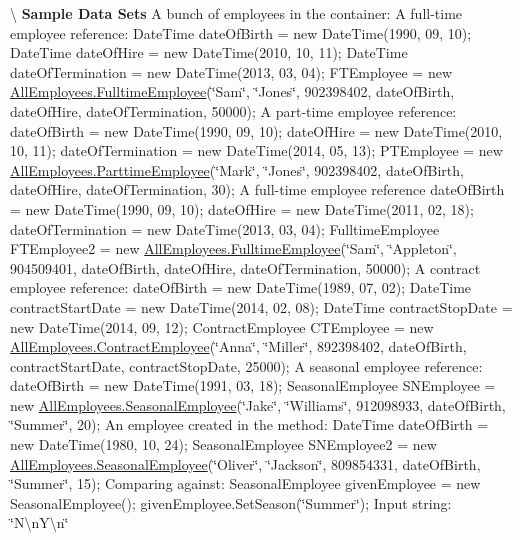 \textbackslash{} {\bfseries  Sample Data Sets} A bunch of employees in the container\+: A full-\/time employee reference\+: Date\+Time date\+Of\+Birth = new Date\+Time(1990, 09, 10); Date\+Time date\+Of\+Hire = new Date\+Time(2010, 10, 11); Date\+Time date\+Of\+Termination = new Date\+Time(2013, 03, 04); F\+T\+Employee = new \hyperlink{class_all_employees_1_1_fulltime_employee}{All\+Employees.\+Fulltime\+Employee}(\char`\"{}\+Sam\char`\"{}, \char`\"{}\+Jones\char`\"{}, 902398402, date\+Of\+Birth, date\+Of\+Hire, date\+Of\+Termination, 50000); A part-\/time employee reference\+: date\+Of\+Birth = new Date\+Time(1990, 09, 10); date\+Of\+Hire = new Date\+Time(2010, 10, 11); date\+Of\+Termination = new Date\+Time(2014, 05, 13); P\+T\+Employee = new \hyperlink{class_all_employees_1_1_parttime_employee}{All\+Employees.\+Parttime\+Employee}(\char`\"{}\+Mark\char`\"{}, \char`\"{}\+Jones\char`\"{}, 902398402, date\+Of\+Birth, date\+Of\+Hire, date\+Of\+Termination, 30); A full-\/time employee reference date\+Of\+Birth = new Date\+Time(1990, 09, 10); date\+Of\+Hire = new Date\+Time(2011, 02, 18); date\+Of\+Termination = new Date\+Time(2013, 03, 04); Fulltime\+Employee F\+T\+Employee2 = new \hyperlink{class_all_employees_1_1_fulltime_employee}{All\+Employees.\+Fulltime\+Employee}(\char`\"{}\+Sam\char`\"{}, \char`\"{}\+Appleton\char`\"{}, 904509401, date\+Of\+Birth, date\+Of\+Hire, date\+Of\+Termination, 50000); A contract employee reference\+: date\+Of\+Birth = new Date\+Time(1989, 07, 02); Date\+Time contract\+Start\+Date = new Date\+Time(2014, 02, 08); Date\+Time contract\+Stop\+Date = new Date\+Time(2014, 09, 12); Contract\+Employee C\+T\+Employee = new \hyperlink{class_all_employees_1_1_contract_employee}{All\+Employees.\+Contract\+Employee}(\char`\"{}\+Anna\char`\"{}, \char`\"{}\+Miller\char`\"{}, 892398402, date\+Of\+Birth, contract\+Start\+Date, contract\+Stop\+Date, 25000); A seasonal employee reference\+: date\+Of\+Birth = new Date\+Time(1991, 03, 18); Seasonal\+Employee S\+N\+Employee = new \hyperlink{class_all_employees_1_1_seasonal_employee}{All\+Employees.\+Seasonal\+Employee}(\char`\"{}\+Jake\char`\"{}, \char`\"{}\+Williams\char`\"{}, 912098933, date\+Of\+Birth, \char`\"{}\+Summer\char`\"{}, 20); An employee created in the method\+: Date\+Time date\+Of\+Birth = new Date\+Time(1980, 10, 24); Seasonal\+Employee S\+N\+Employee2 = new \hyperlink{class_all_employees_1_1_seasonal_employee}{All\+Employees.\+Seasonal\+Employee}(\char`\"{}\+Oliver\char`\"{}, \char`\"{}\+Jackson\char`\"{}, 809854331, date\+Of\+Birth, \char`\"{}\+Summer\char`\"{}, 15); Comparing against\+: Seasonal\+Employee given\+Employee = new Seasonal\+Employee(); given\+Employee.\+Set\+Season(\char`\"{}\+Summer\char`\"{}); Input string\+: \char`\"{}\+N\textbackslash{}n\+Y\textbackslash{}n\char`\"{}

